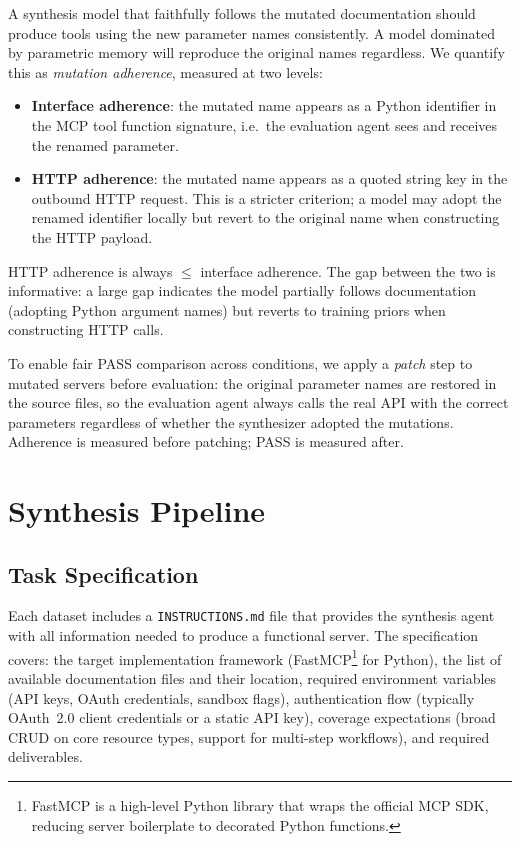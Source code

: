 A synthesis model that faithfully follows the mutated documentation should produce tools using the new parameter names consistently. A model dominated by parametric memory will reproduce the original names regardless. We quantify this as \emph{mutation adherence}, measured at two levels:

\begin{itemize}
  \item \textbf{Interface adherence}: the mutated name appears as a Python
    identifier in the MCP tool function signature, i.e.\ the evaluation agent
    sees and receives the renamed parameter.
  \item \textbf{HTTP adherence}: the mutated name appears as a quoted string
    key in the outbound HTTP request. This is a stricter criterion; a model
    may adopt the renamed identifier locally but revert to the original name
    when constructing the HTTP payload.
\end{itemize}

\noindent
HTTP adherence is always $\leq$ interface adherence. The gap between the two is informative: a large gap indicates the model partially follows documentation (adopting Python argument names) but reverts to training priors when constructing HTTP calls.

To enable fair PASS comparison across conditions, we apply a \emph{patch} step to mutated servers before evaluation: the original parameter names are restored in the source files, so the evaluation agent always calls the real API with the correct parameters regardless of whether the synthesizer adopted the mutations. Adherence is measured before patching; PASS is measured after.

\section{Synthesis Pipeline}

\subsection{Task Specification}

Each dataset includes a \texttt{INSTRUCTIONS.md} file that provides the synthesis agent with all information needed to produce a functional server. The specification covers: the target implementation framework
(FastMCP\footnote{FastMCP is a high-level Python library that wraps the
official MCP SDK, reducing server boilerplate to decorated Python functions.}
for Python), the list of available documentation files and their location,
required environment variables (API keys, OAuth credentials, sandbox flags),
authentication flow (typically OAuth~2.0 client credentials or a static API
key), coverage expectations (broad CRUD on core resource types, support for
multi-step workflows), and required deliverables.

